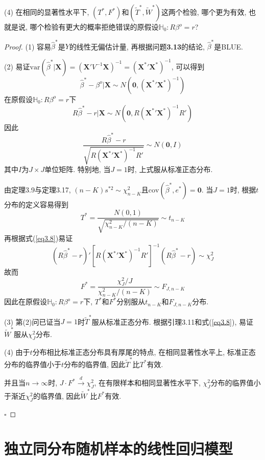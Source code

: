 \documentclass[cn,12pt,math=mtpro2,citestyle=gb7714-2015,bibstyle=gb7714-2015,twocol,mode=simple]{elegantbook}
\newcommand{\var}{\text{var}}
\newcommand{\hbeta}{\hat{\beta}}
\begin{document}
(4) 在相同的显著性水平下, $(T^{\ast}, F^{\ast})$和$(\tilde{T}^{\ast}, \tilde{W}^{\ast})$这两个检验, 哪个更为有效, 也就是说, 哪个检验有更大的概率拒绝错误的原假设$\mathbb{H}_0:R\beta^o=r$?

\begin{proof}
  (1) 容易$\hbeta^{\ast}$是$Y$的线性无偏估计量, 再根据问题\textbf{3.13}的结论, $\hbeta^{\ast}$是BLUE.

  (2) 易证$\var(\hbeta^{\ast}|\mathbf{X})=(\mathbf{X}{'}V^{-1}\mathbf{X})^{-1}=(\mathbf{X}^{\ast}{'}\mathbf{X}^{\ast})^{-1}$, 可以得到
  $$\hbeta^{\ast}-\beta^o|\mathbf{X}\sim N(\mathbf{0}, (\mathbf{X}^{\ast}{'}\mathbf{X}^{\ast})^{-1})$$
  在原假设$\mathbb{H}_0:R\beta^o=r$下
  \begin{equation}\label{eq3.8}
    R\hbeta^{\ast}-r|\mathbf{X}\sim N(\mathbf{0}, R(\mathbf{X}^{\ast}{'}\mathbf{X}^{\ast})^{-1}R') \tag{3.8}
  \end{equation}
  因此
  \begin{equation}
    \frac{R\hbeta^{\ast}-r}{\sqrt{R(\mathbf{X}^{\ast}{'}\mathbf{X}^{\ast})^{-1}R'}}\sim N(\mathbf{0}, I) \nonumber
  \end{equation}
  其中$I$为$J \times J$单位矩阵. 特别地, 当$J=1$时, 上式服从标准正态分布.

  由定理3.9与定理3.17, $(n-K)s^{\ast 2} \sim \chi^2_{n-K}$且$\text{cov}(\hbeta^{\ast},e^{\ast})=\mathbf{0}$. 当$J=1$时, 根据$t$分布的定义容易得到
  $$T^{\ast}=\frac{N(0,1)}{\sqrt{\chi^2_{n-K}/(n-K)}}\sim t_{n-K}$$
  再根据式(\ref{eq3.8})易证
  $$(R\hbeta^{\ast}-r)'[R(\mathbf{X}^{\ast}{'}\mathbf{X}^{\ast})^{-1}R']^{-1}(R\hbeta^{\ast}-r)\sim \chi^2_J$$
  故而
  $$F^{\ast}=\frac{\chi_J^2/J}{\chi^2_{n-K}/(n-K)}\sim F_{J,n-K}$$
  因此在原假设$\mathbb{H}_0:R\beta^o=r$下, $T^{\ast}$和$F^{\ast}$分别服从$t_{n-K}$和$F_{J,n-K}$分布.

  (3) 第(2)问已证当$J=1$时$\tilde{T}^{\ast}$服从标准正态分布. 根据引理3.11和式(\ref{eq3.8}), 易证$\tilde{W}^\ast$服从$\chi_J^2$分布.

  (4) 由于$t$分布相比标准正态分布具有厚尾的特点, 在相同显著性水平上, 标准正态分布的临界值小于$t$分布的临界值, 因此$\tilde{T}^{\ast}$比$T^{\ast}$有效.

  并且当$n\rightarrow\infty$时, $J\cdot F^{\ast}\xrightarrow{d}\chi^2_J$, 在有限样本和相同显著性水平下, $\chi^2_J$分布的临界值小于渐近$\chi^2_J$的临界值, 因此$\tilde{W}^{\ast}$比$F^{\ast}$有效.

  $\square$
\end{proof}
\newpage

\chapter*{独立同分布随机样本的线性回归模型}
\end{document}
